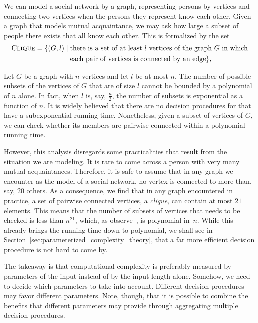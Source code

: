 \begin{example}
\label{ex:clique}%
  We can model a social network by a graph, representing persons by vertices and connecting two vertices when the persons they represent know each other.
  Given a graph that models mutual acquaintance, we may ask how large a subset of people there exists that all know each other.
  This is formalized by the set
  \begin{align*}
    \defkeyat{Clique@\pr{Clique}}{\pr{Clique}} \deq \{(G, l) \st &\text{there is a set of at least $l$ vertices of the graph $G$ in which} \\
    	&\text{each pair of vertices is connected by an edge}\},
  \end{align*}

  Let $G$ be a graph with $n$ vertices and let $l$ be at most $n$.
  The number of possible subsets of the vertices of $G$ that are of size $l$ cannot be bounded by a polynomial of $n$ alone.
  In fact, when $l$ is, say, $\frac{n}{2}$, the number of subsets is exponential as a function of $n$.
  It is widely believed that there are no decision procedures for  that have a subexponential running time.
  Nonetheless, given a subset of vertices of $G$, we can check whether its members are pairwise connected within a polynomial running time.

  However, this analysis disregards some practicalities that result from the situation we are modeling.
  It is rare to come across a person with very many mutual acquaintances.
  Therefore, it is safe to assume that in any graph we encounter as the model of a social network, no vertex is connected to more than, say, $20$ others.
  As a consequence, we find that in any graph encountered in practice, a set of pairwise connected vertices, a \emph{clique}, can contain at most $21$ elements.
  This means that the number of subsets of vertices that needs to be checked is less than $n^{21}$, which, as \citeauthor{garey1979computers} observe~\parencite[Section~4.1]{garey1979computers}, is polynomial in~$n$.
  While this already brings the running time down to polynomial, we shall see in Section~\ref{sec:parameterized_complexity_theory}, that a far more efficient decision procedure is not hard to come by.
\end{example}

The takeaway is that computational complexity is preferably measured by parameters of the input instead of by the input length alone.
Somehow, we need to decide which parameters to take into account.
Different decision procedures may favor different parameters.
Note, though, that it is possible to combine the benefits that different parameters may provide through aggregating multiple decision procedures.

